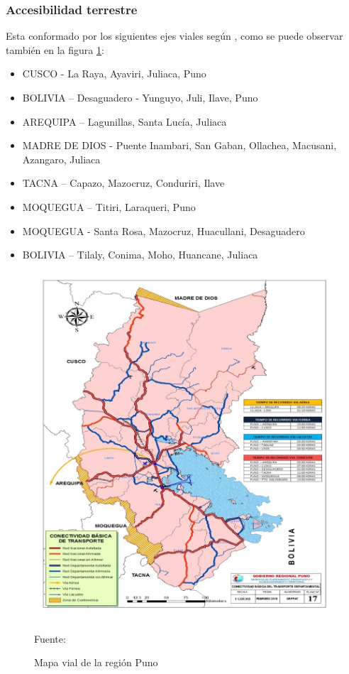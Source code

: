 \subsubsection{Accesibilidad terrestre}
Esta conformado por los siguientes ejes viales según , como se puede observar también en la figura \ref{fig:mapa_vial_puno}:
\begin{itemize}
    \item CUSCO - La Raya, Ayaviri, Juliaca, Puno
    \item BOLIVIA – Desaguadero - Yunguyo, Juli, Ilave, Puno
    \item AREQUIPA – Lagunillas, Santa Lucía, Juliaca
    \item MADRE DE DIOS - Puente Inambari, San Gaban, Ollachea, Macusani, Azangaro, Juliaca
    \item TACNA – Capazo, Mazocruz, Conduriri, Ilave
    \item MOQUEGUA – Titiri, Laraqueri, Puno
    \item MOQUEGUA - Santa Rosa, Mazocruz, Huacullani, Desaguadero
    \item BOLIVIA – Tilaly, Conima, Moho, Huancane, Juliaca
\end{itemize}
\begin{figure}[!ht]
    \centering
    \includegraphics[scale=1]{Capitulo4/Figs/mapa-vial-puno.jpg}
    \caption{Mapa vial de la región Puno}
    Fuente: 
    \label{fig:mapa_vial_puno}
\end{figure}
